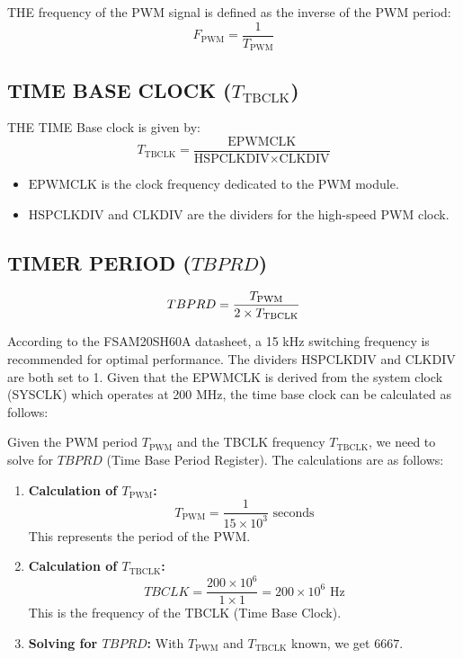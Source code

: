 THE frequency of the PWM signal is defined as the inverse of the PWM period:
\[
	F_{\text{PWM}} = \frac{1}{T_{\text{PWM}}}
\]

\subsection{TIME BASE CLOCK (\( T_{\text{TBCLK}} \))}
THE TIME Base clock is given by:
\[
	T_{\text{TBCLK}} = \frac{\text{EPWMCLK}}{\text{HSPCLKDIV} \times \text{CLKDIV}}
\]
\begin{itemize}
	\item \( \text{EPWMCLK} \) is the clock frequency dedicated to the PWM module.
	\item \( \text{HSPCLKDIV} \) and \( \text{CLKDIV} \) are the dividers for the high-speed PWM clock.
\end{itemize}

\subsection{TIMER PERIOD (\( TBPRD \))}

\[
	TBPRD = {T_{\text{PWM}} \over 2 \times T_{\text{TBCLK}}}
\]

According to the FSAM20SH60A datasheet, a 15 kHz switching frequency is recommended for optimal performance. The dividers \( \text{HSPCLKDIV} \) and \( \text{CLKDIV} \) are both set to 1. Given that the EPWMCLK is derived from the system clock (SYSCLK) which operates at 200 MHz, the time base clock can be calculated as follows:

Given the PWM period \( T_{\text{PWM}} \) and the TBCLK frequency \( T_{\text{TBCLK}} \), we need to solve for \( TBPRD \) (Time Base Period Register). The calculations are as follows:

\begin{enumerate}
	\item \textbf{Calculation of \( T_{\text{PWM}} \):}
	      \[
		      T_{\text{PWM}} = \frac{1}{15 \times 10^3} \text{ seconds}
	      \]
	      This represents the period of the PWM.

	\item \textbf{Calculation of \( T_{\text{TBCLK}} \):}
	      \[
		      TBCLK = \frac{200 \times 10^6}{1 \times 1} = 200 \times 10^6 \text{ Hz}
	      \]
	      This is the frequency of the TBCLK (Time Base Clock).

	\item \textbf{Solving for \( TBPRD \):}
	      With \( T_{\text{PWM}} \) and \( T_{\text{TBCLK}} \) known, we get $6667$.
\end{enumerate}


